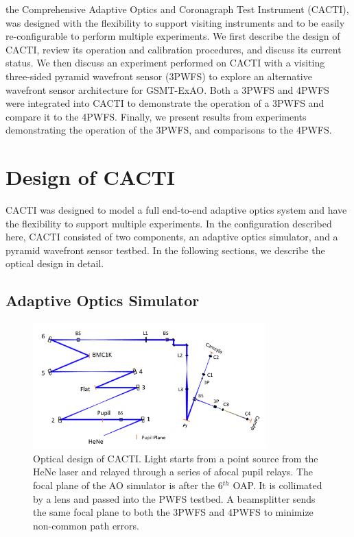 the Comprehensive Adaptive Optics and Coronagraph Test Instrument (CACTI), was designed with the flexibility to support visiting instruments and to be easily re-configurable to perform multiple experiments. We first describe the design of CACTI, review its operation and calibration procedures, and discuss its current status. We then discuss an experiment performed on CACTI with a visiting three-sided pyramid wavefront sensor (3PWFS) to explore an alternative wavefront sensor architecture for GSMT-ExAO. Both a 3PWFS and 4PWFS were integrated into CACTI to demonstrate the operation of a 3PWFS and compare it to the 4PWFS. Finally, we present results from experiments demonstrating the operation of the 3PWFS, and comparisons to the 4PWFS.

\section{Design of CACTI}
CACTI was designed to model a full end-to-end adaptive optics system and have the flexibility to support multiple experiments. In the configuration described here, CACTI consisted of two components, an adaptive optics simulator, and a pyramid wavefront sensor testbed. In the following sections, we describe the optical design in detail. 

\subsection{Adaptive Optics Simulator}

\begin{figure}
    \centering
    \includegraphics[width=0.8\textwidth]{Chapter Materials/Chapter Five Materials/CACTIzemax.png}
    \caption{Optical design of CACTI. Light starts from a point source from the HeNe laser and relayed through a series of afocal pupil relays. The focal plane of the AO simulator is after the 6${^{th}}$ OAP. It is collimated by a lens and passed into the PWFS testbed. A beamsplitter sends the same focal plane to both the 3PWFS and 4PWFS to minimize non-common path errors.}
    \label{fig:CACTIZemax}
\end{figure}

